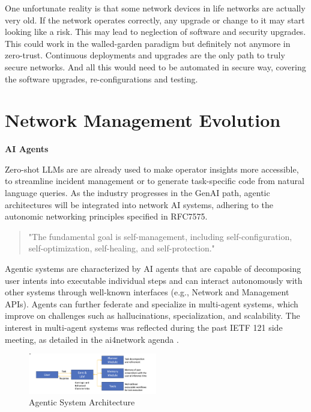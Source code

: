 \documentclass[10pt,sigconf]{iabart}
\begin{document}
One unfortunate reality is that some network devices in life networks are actually very old. If the network operates correctly, any upgrade or change to it may start looking like a risk. This may lead to neglection of software and security upgrades. This could work in the walled-garden paradigm but definitely not anymore in zero-trust. Continuous deployments and upgrades are the only path to truly secure networks. And all this would need to be automated in secure way, covering the software upgrades, re-configurations and testing.

 
\section{Network Management Evolution} \label{insights}


\textbf{AI Agents}

Zero-shot LLMs are are already used to make operator insights more accessible, to streamline incident management or to generate task-specific code from natural language queries. As the industry progresses in the GenAI path, agentic architectures will be integrated into network AI systems, adhering to the autonomic networking principles specified in RFC7575.

\begin{quote}
"The fundamental goal is self-management, including self-configuration, self-optimization, self-healing, and self-protection." \cite{RFC7575}
\end{quote}

Agentic systems are characterized by AI agents that are capable of decomposing user intents into executable individual steps and can interact autonomously with other systems through well-known interfaces (e.g., Network and Management APIs). Agents can further federate and specialize in multi-agent systems, which improve on challenges such as hallucinations, specialization, and scalability. The interest in multi-agent systems was reflected during the past IETF 121 side meeting, as detailed in the ai4network agenda \cite{ai4network-agenda}. 

\begin{figure}[h]
  \centering
  \includegraphics[width=0.5\textwidth]{figs/agent.png}
  \caption{Agentic System Architecture}
  \label{fig:agent_architecture}
\end{figure}
\end{document}
